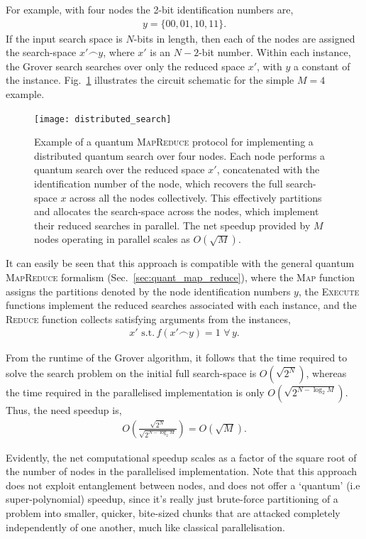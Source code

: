 For example, with four nodes the 2-bit identification numbers are, 
\begin{align}
	y=\{00,01,10,11\}.
\end{align}
If the input search space is $N$-bits in length, then each of the nodes are assigned the search-space \mbox{$x'\frown y$}, where $x'$ is an \mbox{$N-2$}-bit number. Within each instance, the Grover search searches over only the reduced space $x'$, with $y$ a constant of the instance. Fig.~\ref{fig:distributed_search} illustrates the circuit schematic for the simple \mbox{$M=4$} example.

\begin{figure}[!htbp]
	\texttt{[image: distributed\_search]}
	\captionspacefig \caption{Example of a quantum \textsc{MapReduce} protocol for implementing a distributed quantum search over four nodes. Each node performs a quantum search over the reduced space $x'$, concatenated with the identification number of the node, which recovers the full search-space $x$ across all the nodes collectively. This effectively partitions and allocates the search-space across the nodes, which implement their reduced searches in parallel. The net speedup provided by $M$ nodes operating in parallel scales as $O(\sqrt{M})$.}\label{fig:distributed_search}
\end{figure}

It can easily be seen that this approach is compatible with the general quantum \textsc{MapReduce} formalism (Sec.~\ref{sec:quant_map_reduce}), where the \textsc{Map} function assigns the partitions denoted by the node identification numbers $y$, the \textsc{Execute} functions implement the reduced searches associated with each instance, and the \textsc{Reduce} function collects satisfying arguments from the instances,
\begin{align}
	x'\,\, \mathrm{s.t.}\, f(x'\frown y)=1\,\,\forall\, y.
\end{align}

From the runtime of the Grover algorithm, it follows that the time required to solve the search problem on the initial full search-space is $O(\sqrt{2^N})$, whereas the time required in the parallelised implementation is only $O(\sqrt{2^{N-\log_2 M}})$. Thus, the need speedup is,
\begin{align}
	O\left(\frac{\sqrt{2^N}}{\sqrt{2^{N-\log_2 M}}}\right) = O(\sqrt{M}).
\end{align}

Evidently, the net computational speedup scales as a factor of the square root of the number of nodes in the parallelised implementation. Note that this approach does not exploit entanglement between nodes, and does not offer a `quantum' (i.e super-polynomial) speedup, since it's really just brute-force partitioning of a problem into smaller, quicker, bite-sized chunks that are attacked completely independently of one another, much like classical parallelisation.

